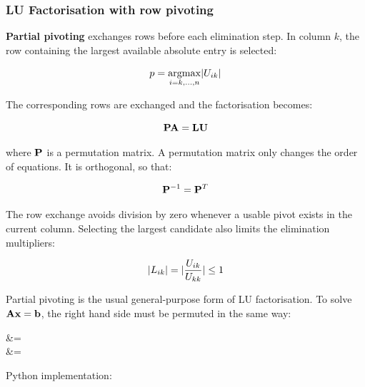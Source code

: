 \subsubsection{LU Factorisation with row pivoting}

\textbf{Partial pivoting} exchanges rows before each elimination step. In column
$ k $, the row containing the largest available absolute entry is selected:

\begin{equation}
    p = \underset{i=k,\dots,n}{\operatorname{argmax}}| {U_{ik}} |
\end{equation}

The corresponding rows are exchanged and the factorisation becomes:

\begin{equation}
    \mathbf{P}\mathbf{A}=\mathbf{L}\mathbf{U}
\end{equation}

where $ \mathbf{P} $ is a permutation matrix. A permutation matrix only changes the
order of equations. It is orthogonal, so that:

\begin{equation}
    \mathbf{P}^{-1}=\mathbf{P}^{T}
\end{equation}

The row exchange avoids division by zero whenever a usable pivot exists in the
current column. Selecting the largest candidate also limits the elimination
multipliers:

\begin{equation}
    | {L_{ik}} | = | {\frac{U_{ik}}{U_{kk}}} | \leq 1
\end{equation}

Partial pivoting is the usual general-purpose form of LU factorisation. To solve
$ \mathbf{A}\mathbf{x}=\mathbf{b} $, the right hand side must be permuted in the same way:

\begin{eqarray}
     &=  \\
     &= 
\end{eqarray}

Python implementation:

